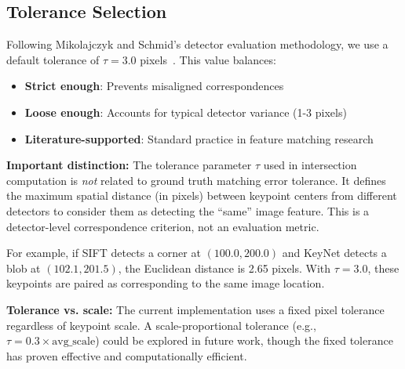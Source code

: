 \subsection{Tolerance Selection}

Following Mikolajczyk and Schmid's detector evaluation methodology, we use a default tolerance of $\tau = 3.0$ pixels~\cite{mikolajczyk2003evaluation}.
This value balances:

\begin{itemize}
    \item \textbf{Strict enough}: Prevents misaligned correspondences
    \item \textbf{Loose enough}: Accounts for typical detector variance (1-3 pixels)
    \item \textbf{Literature-supported}: Standard practice in feature matching research
\end{itemize}

\textbf{Important distinction:} The tolerance parameter $\tau$ used in intersection computation is \textit{not} related to ground truth matching error tolerance. It defines the maximum spatial distance (in pixels) between keypoint centers from different detectors to consider them as detecting the ``same'' image feature. This is a detector-level correspondence criterion, not an evaluation metric.

For example, if SIFT detects a corner at $(100.0, 200.0)$ and KeyNet detects a blob at $(102.1, 201.5)$, the Euclidean distance is 2.65 pixels. With $\tau = 3.0$, these keypoints are paired as corresponding to the same image location.

\textbf{Tolerance vs. scale:} The current implementation uses a fixed pixel tolerance regardless of keypoint scale. A scale-proportional tolerance (e.g., $\tau = 0.3 \times \text{avg\_scale}$) could be explored in future work, though the fixed tolerance has proven effective and computationally efficient.

